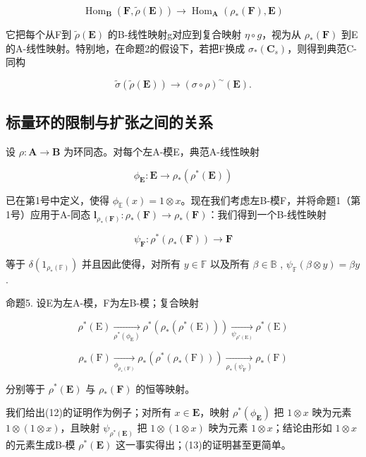 \[
\operatorname{Hom} _ {\mathbf {B}} (\mathbf {F}, \tilde {\rho} (\mathbf {E})) \rightarrow \operatorname{Hom} _ {\mathbf {A}} (\rho_ {*} (\mathbf {F}), \mathbf {E})\tag{8}
\]

它把每个从F到 \(\tilde{\rho}(\mathbf{E})\) 的B-线性映射g对应到复合映射 \(\eta \circ g\)，视为从 \(\rho_{*}(\mathbf{F})\) 到E的A-线性映射。特别地，在命题2的假设下，若把F换成 \(\sigma_{*}(\mathbf{C}_{s})\)，则得到典范C-同构

\[
\tilde {\sigma} (\tilde {\rho} (\mathbf {E})) \rightarrow (\sigma \circ \rho) ^ {\sim} (\mathbf {E}).\tag{9}
\]

\subsection{标量环的限制与扩张之间的关系}

设 \(\rho: \mathbf{A} \to \mathbf{B}\) 为环同态。对每个左A-模E，典范A-线性映射

\[
\phi_ {\mathbf {E}}: \mathbf {E} \rightarrow \rho_ {*} (\rho^ {*} (\mathbf {E}))\tag{10}
\]

已在第1号中定义，使得 \(\phi_{\mathbb{E}}(x) = 1 \otimes x\)。现在我们考虑左B-模F，并将命题1（第1号）应用于A-同态 \(\mathbf{l}_{\rho_{*}(\mathbf{F})}: \rho_{*}(\mathbf{F}) \to \rho_{*}(\mathbf{F})\)：我们得到一个B-线性映射

\[
\psi_ {\mathbf {F}} \colon \rho^ {*} (\rho_ {*} (\mathbf {F})) \rightarrow \mathbf {F}\tag{11}
\]

等于 \(\delta(1_{\rho_*(\mathbb{F})})\) 并且因此使得，对所有 \(y \in \mathbb{F}\) 以及所有 \(\beta \in \mathbb{B}\) , \(\psi_{\mathbb{F}}(\beta \otimes y) = \beta y\) .

命题5. 设E为左A-模，F为左B-模；复合映射

\[
\rho^ {*} (\mathrm{E}) \xrightarrow [ \rho^ {*} (\phi_ {\mathrm{E}}) ]{} \rho^ {*} (\rho_ {*} (\rho^ {*} (\mathrm{E}))) \xrightarrow [ \psi_ {\rho^ {*} (\mathrm{E})} ]{} \rho^ {*} (\mathrm{E})\tag{12}
\]

\[
\rho_ {*} (\mathrm{F}) \xrightarrow [ \phi_ {\rho_ {*} (\mathrm{F})} ]{} \rho_ {*} (\rho^ {*} (\rho_ {*} (\mathrm{F}))) \xrightarrow [ \rho_ {*} (\psi_ {\mathrm{F}}) ]{} \rho_ {*} (\mathrm{F})\tag{13}
\]

分别等于 \(\rho^{*}(\mathbf{E})\) 与 \(\rho_{*}(\mathbf{F})\) 的恒等映射。

我们给出(12)的证明作为例子；对所有 \(x \in \mathbf{E}\)，映射 \(\rho^{*}(\phi_{\mathbf{E}})\) 把 \(1 \otimes x\) 映为元素 \(1 \otimes (1 \otimes x)\)，且映射 \(\psi_{\rho^{*}(\mathbf{E})}\) 把 \(1 \otimes (1 \otimes x)\) 映为元素 \(1 \otimes x\)；结论由形如 \(1 \otimes x\) 的元素生成B-模 \(\rho^{*}(\mathbf{E})\) 这一事实得出；(13)的证明甚至更简单。

